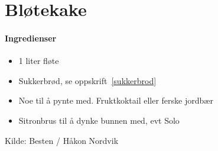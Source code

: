 \section{Bløtekake}


\paragraph{Ingredienser}
\begin{itemize}[noitemsep]
  \item 1 liter fløte
  \item Sukkerbrød, se oppskrift~\ref{sukkerbrod}
  \item Noe til å pynte med. Fruktkoktail eller ferske jordbær
  \item Sitronbrus til å dynke bunnen med, evt Solo
\end{itemize}


Kilde: Besten / Håkon Nordvik
